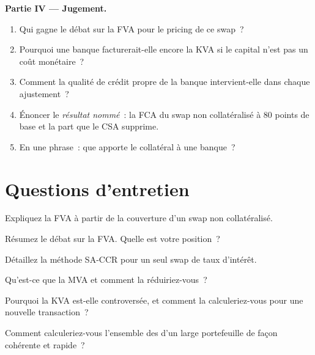 \begin{problem}
\medskip\noindent\textbf{Partie IV --- Jugement.}
\begin{enumerate}[resume]
\item Qui gagne le débat sur la FVA pour le pricing de ce swap~?
\item Pourquoi une banque facturerait-elle encore la KVA si le capital n'est pas un coût monétaire~?
\item Comment la qualité de crédit propre de la banque intervient-elle dans chaque ajustement~?
\item Énoncer le \emph{résultat nommé}~: la FCA du swap non collatéralisé à 80 points de base
et la part que le CSA supprime.
\item En une phrase~: que apporte le collatéral à une banque~?
\end{enumerate}
\end{problem}

\section{Questions d'entretien}

\begin{interviewq}\label{iq:rc:funding-margin-and-capital-adjustments:1}
Expliquez la FVA à partir de la couverture d'un swap non collatéralisé.
\end{interviewq}

\begin{interviewq}\label{iq:rc:funding-margin-and-capital-adjustments:2}
Résumez le débat sur la FVA. Quelle est votre position~?
\end{interviewq}

\begin{interviewq}\label{iq:rc:funding-margin-and-capital-adjustments:3}
Détaillez la méthode SA-CCR pour un seul swap de taux d'intérêt.
\end{interviewq}

\begin{interviewq}\label{iq:rc:funding-margin-and-capital-adjustments:4}
Qu'est-ce que la MVA et comment la réduiriez-vous~?
\end{interviewq}

\begin{interviewq}\label{iq:rc:funding-margin-and-capital-adjustments:5}
Pourquoi la KVA est-elle controversée, et comment la calculeriez-vous pour une nouvelle transaction~?
\end{interviewq}

\begin{interviewq}\label{iq:rc:funding-margin-and-capital-adjustments:6}
Comment calculeriez-vous l'ensemble des  d'un large portefeuille de façon cohérente et rapide~?
\end{interviewq}

